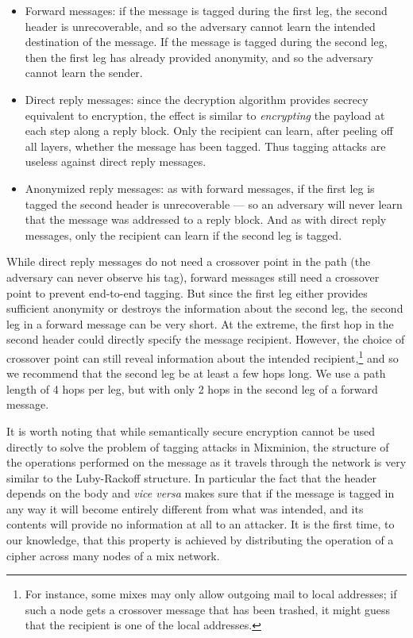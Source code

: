\documentclass[11pt]{IEEEtran}
\begin{document}
\begin{itemize}
\item Forward messages: if the message is tagged during the first leg,
the second header is unrecoverable, and so the adversary cannot
learn the intended destination of the message. If the message is tagged
during the second leg, then the first leg has already provided anonymity,
and so the adversary cannot learn the sender.
\item Direct reply messages: since the decryption algorithm provides
secrecy equivalent to encryption, the effect is similar to {\em encrypting}
the payload at each step along a reply block. Only the recipient can learn,
after peeling off all layers, whether the message has been tagged. Thus
tagging attacks are useless against direct reply messages.
\item Anonymized reply messages: as with forward messages, if the first leg
is tagged the second header is unrecoverable --- so an adversary will
never learn that the message was addressed to a reply block. And as with
direct reply messages, only the recipient can learn if the second leg is
tagged.
\end{itemize}

While direct reply messages do not need a crossover point in the path
(the adversary can never observe his tag), forward messages still need a
crossover point to prevent end-to-end tagging. But since the first leg
either provides sufficient anonymity or destroys the information about
the second leg, the second leg in a forward message can be very short.
At the extreme, the first hop in the second header could directly
specify the message recipient. However, the choice of crossover point
can still reveal information about the intended recipient,\footnote{For instance,
some mixes may only allow outgoing mail to local addresses; if such a
node gets a crossover message that has been trashed, it might guess
that the recipient is one of the local addresses.} and so we recommend
that the second leg be at least a few hops long.
We use a path length of 4 hops per leg, but with only 2 hops in the
second leg of a forward message.

It is worth noting that while semantically secure encryption cannot be
used directly to solve the problem of tagging attacks in Mixminion, the
structure of the operations performed on the message as it travels
through the network is very similar to the Luby-Rackoff \cite{sprp}
structure. In particular the fact that the header depends on the body
and \emph{vice versa} makes sure that if the message is tagged in
any way it will become entirely different from what was intended, and
its contents
will provide no information at all to an attacker. It is the
first time, to our knowledge, that this property is achieved by
distributing the operation of a cipher across many nodes of a mix network.
\end{document}
